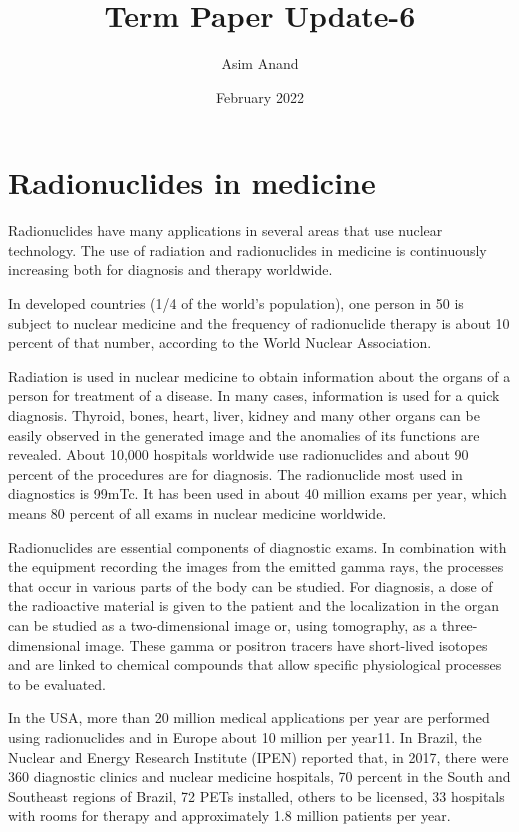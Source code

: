 \documentclass{article}
\title{Term Paper Update-6}
\author{Asim Anand}
\date{February 2022}
\begin{document}
\maketitle

\section{Radionuclides in medicine}
Radionuclides  have  many  applications  in several areas that use nuclear technology. The use of  radiation  and  radionuclides  in  medicine  is continuously  increasing  both  for  diagnosis  and therapy worldwide.

In  developed  countries  (1/4  of  the  world’s population), one person in 50 is subject to nuclear medicine and the frequency of radionuclide therapy is  about  10 percent  of  that  number,  according  to  the World Nuclear Association.

Radiation is used in nuclear medicine to obtain information  about  the  organs  of  a  person  for treatment of a disease. In many cases, information is used for a quick diagnosis. Thyroid, bones, heart, liver, kidney and many other organs can be easily observed in the generated image and the anomalies of  its  functions  are  revealed.  About  10,000 hospitals worldwide use  radionuclides and about 90 percent  of  the  procedures  are  for  diagnosis.  The radionuclide most used in diagnostics is 99mTc. It has been used in about 40 million exams per year, which means 80 percent of all exams in nuclear medicine worldwide.

Radionuclides  are  essential  components  of diagnostic  exams.  In  combination  with  the equipment recording the images from the emitted gamma rays,  the processes that occur  in various parts of the body can be studied. For diagnosis, a dose  of  the radioactive  material  is given  to  the patient  and the  localization in  the organ  can  be studied  as  a  two-dimensional  image  or,  using tomography, as a three-dimensional image. These gamma  or  positron  tracers  have  short-lived isotopes and are linked to chemical compounds that allow  specific  physiological  processes  to  be evaluated.

In  the  USA,  more  than  20  million  medical applications  per  year  are  performed  using radionuclides and in Europe about 10 million per year11. In Brazil, the Nuclear and Energy Research Institute (IPEN) reported that, in 2017, there were 360  diagnostic  clinics  and  nuclear  medicine hospitals, 70 percent in the South and Southeast regions of Brazil, 72 PETs installed, others to be licensed, 33  hospitals  with  rooms  for  therapy  and approximately 1.8 million patients per year.
\end{document}
